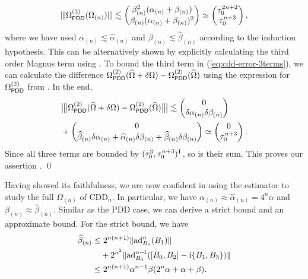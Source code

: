 \documentclass[pra,reprint,superscriptaddress]{revtex4-2}
\newcommand{\Opdd}{\Omega_{\mathsf{PDD}}}
\begin{document}
{\begin{equation*}
\opnorm{\Opdd\up{3}(\Omega_{(n)})} 
\lesssim\begin{pmatrix}
\beta_{(n)}^2 (\alpha_{(n)}+\beta_{(n)}) \\
\beta_{(n)} (\alpha_{(n)}+\beta_{(n)})^2
\end{pmatrix}
\simeq \begin{pmatrix}
\Dt^{2n+2}\\
\Dt^{n+3}
\end{pmatrix},
\end{equation*}
where we have used $\alpha_{(n)}\lesssim\widehat\alpha_{(n)}$ and $\beta_{(n)}\lesssim\widehat\beta_{(n)}$ according to the induction hypothesis.
This can be alternatively shown by explicitly calculating the third order Magnus term using . 
To bound the third term in (\ref{eq:cdd-error-3terms}), we can calculate the difference $\Opdd\up{2}(\Ohat+\delta\Omega) - \Opdd\up{2}(\Ohat)$
using the expression for $\Opdd\up{2}$ from .  In the end,
\begin{equation*}
\begin{split}
&\opnorm[\big]{\Opdd\up{2}(\Ohat+\delta\Omega) - \Opdd\up{2}(\Ohat)} 
\lesssim\begin{pmatrix}
    0\\
    \delta\alpha_{(n)}\delta\beta_{(n)}
\end{pmatrix}\\
&+\begin{pmatrix}
    0\\
    \widehat\beta_{(n)}\delta\alpha_{(n)} + \widehat\alpha_{(n)} \delta\beta_{(n)}
    +\widehat\beta_{(n)} \delta\beta_{(n)} 
\end{pmatrix}\simeq
\begin{pmatrix}
    0\\
    \Dt^{n+3}
\end{pmatrix}.
\end{split}
\end{equation*}
Since all three terms are bounded by $(\tau_0^3, \tau_0^{n+3})^{\mkern-1.5mu\mathsf{T}}$, so is their sum. This proves our assertion . \qed

\smallskip

Having showed its faithfulness, we are now confident in using the estimator  to study the full $\Omega_{(n)}$ of $\mathrm{CDD}_n$. In particular, we have $\alpha_{(n)}\approx\widehat\alpha_{(n)}=4^n \alpha$ and
$\beta_{(n)}\approx\widehat{\beta}_{(n)}$.
Similar as the PDD case, we can derive a strict bound and an approximate bound. For the strict bound, we have
\begin{equation}\label{eq:cdd-errph-bound1}
\begin{aligned}
\widehat{\beta}_{(n)} &\le   2^{n(n+1)}\Vert {\operatorname{ad}_{B_0}^{n}(B_1)} \Vert \\
&\quad + 2^{n^2} 
\Vert {\operatorname{ad}_{B_0}^{n-\!1}([B_0,B_2] - \mathrm{i}\{B_1,B_3\})} \Vert\\
&\le  2^{n(n+1)}\alpha^{n-1}\beta (2^n \alpha+ \alpha + \beta).
\end{aligned}
\end{equation}
}









\appendix
\end{document}
